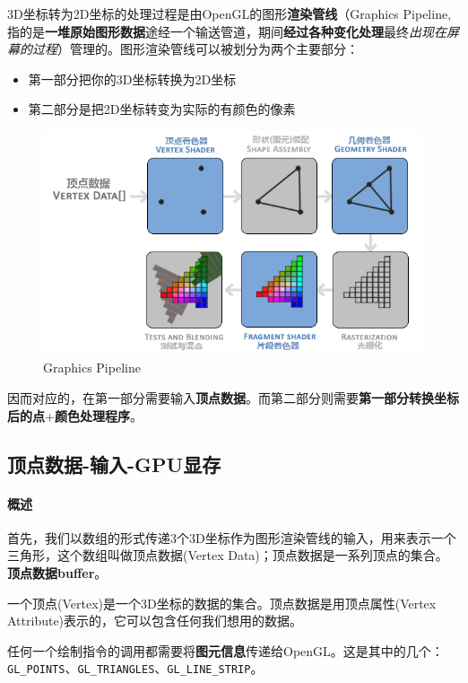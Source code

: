 \documentclass[UTF8,a4paper,12pt]{ctexbook}
\begin{document}
			3D坐标转为2D坐标的处理过程是由OpenGL的图形\textbf{渲染管线}（Graphics Pipeline,指的是\textbf{一堆原始图形数据}途经一个输送管道，期间\textbf{经过各种变化处理}最终\textit{出现在屏幕的过程}）管理的。图形渲染管线可以被划分为两个主要部分：
				\begin{itemize}[itemindent = 1em]
					\item 第一部分把你的3D坐标转换为2D坐标
					\item 第二部分是把2D坐标转变为实际的有颜色的像素
				\end{itemize}
			
			\begin{figure}[H]
				\centering
				\includegraphics[width=.93\linewidth]{PipelineBase}
				\caption{Graphics Pipeline}
			\end{figure}

			
			因而对应的，在第一部分需要输入\textbf{顶点数据}。而第二部分则需要\textbf{第一部分转换坐标后的点}+\textbf{颜色处理程序}。
			
		
		\subsection{顶点数据-输入-GPU显存}
			
			\paragraph{概述}
				首先，我们以数组的形式传递3个3D坐标作为图形渲染管线的输入，用来表示一个三角形，这个数组叫做顶点数据(Vertex Data)；顶点数据是一系列顶点的集合。
				\textbf{顶点数据buffer}。
				
				一个顶点(Vertex)是一个3D坐标的数据的集合。顶点数据是用顶点属性(Vertex Attribute)表示的，它可以包含任何我们想用的数据。
				
				任何一个绘制指令的调用都需要将\textbf{图元信息}传递给OpenGL。这是其中的几个：\verb|GL_POINTS|、\verb|GL_TRIANGLES|、\verb|GL_LINE_STRIP|。
				
\end{document}
